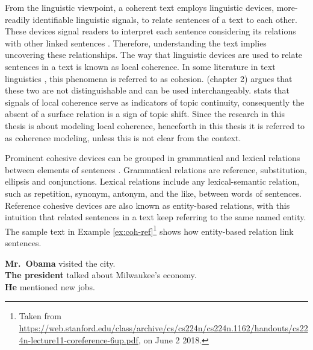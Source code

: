 From the linguistic viewpoint, a coherent text employs linguistic devices, more-readily identifiable linguistic signals, to relate sentences of a text to each other. 
These devices signal readers to interpret each sentence considering its relations with other linked sentences \cite{vandijk77}. 
Therefore, understanding the text implies uncovering these relationships.  
The way that linguistic devices are used to relate sentences in a text is known as local coherence. 
In some literature in text linguistics \cite{halliday76}, this phenomena is referred to as cohesion.   
 (chapter 2) argues that these two are not distinguishable and can be used interchangeably. 
 stats that signals of local coherence serve as indicators of topic continuity, consequently the absent of a surface relation is a sign of topic shift. 
Since the research in this thesis is about modeling local coherence, henceforth in this thesis it is referred to as coherence modeling, unless this is not clear from the context. 

Prominent cohesive devices can be grouped in grammatical and lexical relations between elements of sentences \cite{halliday76}. 
Grammatical relations are reference, substitution, ellipsis and conjunctions. 
Lexical relations include any lexical-semantic relation, such as repetition, synonym, antonym, and the like, between words of sentences. 
Reference cohesive devices are also known as entity-based relations, with this intuition that related sentences in a text keep referring to the same named entity. 
The sample text in Example \ref{ex:coh-ref}\footnote{Taken from \url{https://web.stanford.edu/class/archive/cs/cs224n/cs224n.1162/handouts/cs224n-lecture11-coreference-6up.pdf}, on June 2 2018.} shows how entity-based relation link sentences. 

\begin{examples}
	\label{ex:coh-ref}
	\textbf{Mr.\ Obama} visited the city. \\
	\textbf{The president} talked about Milwaukee’s economy. \\
	\textbf{He} mentioned new jobs. \\
\end{examples} 


